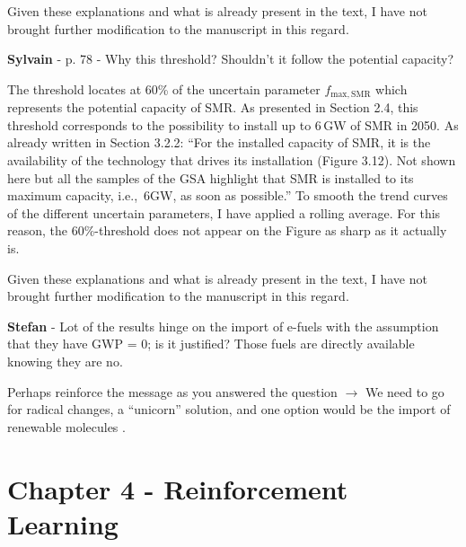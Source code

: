 \documentclass[12pt,a4paper]{article}
\def\ie{i.e.,\ }
\begin{document}
Given these explanations and what is already present in the text, I have not brought further modification to the manuscript in this regard.

\begin{mdframed}[style=comment] %
{\color{purple} \textbf{Sylvain}} - p. 78 - Why this threshold? Shouldn't it follow the potential capacity?
\end{mdframed}

\noindent The threshold locates at 60\% of the uncertain parameter $f_{\mathrm{max,SMR}}$ which represents the potential capacity of SMR. As presented in Section 2.4, this threshold corresponds to the possibility to install up to 6\,GW of SMR in 2050. As already written in Section 3.2.2: ``For the installed capacity of SMR, it is the availability of the technology that drives its installation (Figure 3.12). Not shown here but all the samples of the GSA highlight that SMR is installed to its maximum capacity, \ie 6GW, as soon as possible.'' To smooth the trend curves of the different uncertain parameters, I have applied a rolling average.  For this reason, the 60\%-threshold does not appear on the Figure as sharp as it actually is.

Given these explanations and what is already present in the text, I have not brought further modification to the manuscript in this regard.

\begin{mdframed}[style=comment] %
{\color{teal} \textbf{Stefan}} - Lot of the results hinge on the import of e-fuels with the assumption that they have GWP = 0; is it justified? Those fuels are directly available knowing they are no.
\end{mdframed}

\noindent Perhaps reinforce the message as you answered the question $\rightarrow$ We need to go for radical changes, a “unicorn” solution, and one option would be the import of renewable molecules {\color{blue} }. 

\begin{mdframed}[style=manuscript] %

\end{mdframed}

\section{Chapter 4 - Reinforcement Learning}
\label{Chap_RL}
\end{document}
